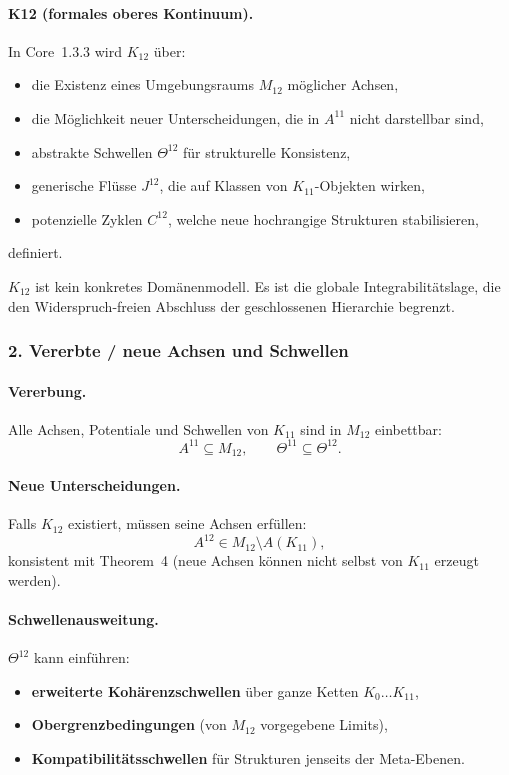 \paragraph{K12 (formales oberes Kontinuum).}
In Core~1.3.3 wird $K_{12}$ über:
\begin{itemize}
  \item die Existenz eines Umgebungsraums $M_{12}$ möglicher Achsen,
  \item die Möglichkeit neuer Unterscheidungen, die in $A^{11}$ nicht darstellbar sind,
  \item abstrakte Schwellen $\Theta^{12}$ für strukturelle Konsistenz,
  \item generische Flüsse $J^{12}$, die auf Klassen von $K_{11}$-Objekten wirken,
  \item potenzielle Zyklen $C^{12}$, welche neue hochrangige Strukturen stabilisieren,
\end{itemize}
definiert.

$K_{12}$ ist kein konkretes Domänenmodell. Es ist die globale Integrabilitätslage,
die den Widerspruch-freien Abschluss der geschlossenen Hierarchie begrenzt.

\subsubsection{2. Vererbte / neue Achsen und Schwellen}

\paragraph{Vererbung.}
Alle Achsen, Potentiale und Schwellen von $K_{11}$ sind in $M_{12}$ einbettbar:
\[
A^{11} \subseteq M_{12}, \qquad
\Theta^{11} \subseteq \Theta^{12}.
\]

\paragraph{Neue Unterscheidungen.}
Falls $K_{12}$ existiert, müssen seine Achsen erfüllen:
\[
A^{12} \in M_{12} \setminus A(K_{11}),
\]
konsistent mit Theorem~4 (neue Achsen können nicht selbst von $K_{11}$ erzeugt werden).

\paragraph{Schwellenausweitung.}
$\Theta^{12}$ kann einführen:
\begin{itemize}
  \item \textbf{erweiterte Kohärenzschwellen} über ganze Ketten
        $K_0\dots K_{11}$,
  \item \textbf{Obergrenzbedingungen} (von $M_{12}$ vorgegebene Limits),
  \item \textbf{Kompatibilitätsschwellen} für Strukturen jenseits der Meta-Ebenen.
\end{itemize}

